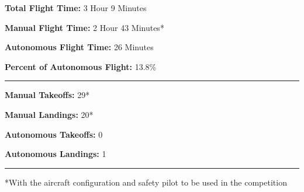\documentclass[]{auvsi_doc}
\begin{document}
\textbf{Total Flight Time:} 3 Hour 9 Minutes

\textbf{Manual Flight Time:} 2 Hour 43 Minutes*

\textbf{Autonomous Flight Time:} 26 Minutes

\textbf{Percent of Autonomous Flight:} 13.8\%

\hrule
\textbf{Manual Takeoffs:} 29*

\textbf{Manual Landings:} 20*

\textbf{Autonomous Takeoffs:} 0

\textbf{Autonomous Landings:} 1

\hrule
*With the aircraft configuration and safety pilot to be used in the competition
\end{document}
